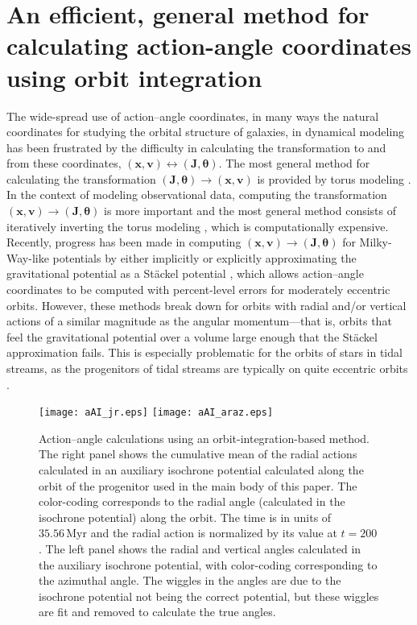 \documentclass{emulateapj}
\newcommand{\eg}{e.g.}
\renewcommand{\vec}[1]{\ensuremath{\mathbf{#1}}}
\newcommand{\vecx}{\ensuremath{\vec{x}}}
\newcommand{\vecv}{\ensuremath{\vec{v}}}
\newcommand{\vecj}{\ensuremath{\vec{J}}}
\newcommand{\veca}{\ensuremath{\boldsymbol\theta}}
\newcommand{\Myr}{\ensuremath{\,\mathrm{Myr}}}
\begin{document}
\appendix

\section{An efficient, general method for calculating action-angle coordinates using orbit integration}\label{sec:aa}

The wide-spread use of action--angle coordinates, in many ways the
natural coordinates for studying the orbital structure of galaxies, in
dynamical modeling has been frustrated by the difficulty in
calculating the transformation to and from these coordinates,
$(\vecx,\vecv) \leftrightarrow (\vecj,\veca)$. The most general method
for calculating the transformation $(\vecj,\veca) \rightarrow
(\vecx,\vecv)$ is provided by torus modeling \citep{McGill90a}. In the
context of modeling observational data, computing the transformation
$(\vecx,\vecv) \rightarrow (\vecj,\veca)$ is more important and the
most general method consists of iteratively inverting the torus
modeling \citep{McMillan08a}, which is computationally
expensive. Recently, progress has been made in computing
$(\vecx,\vecv) \rightarrow (\vecj,\veca)$ for Milky-Way-like
potentials by either implicitly or explicitly approximating the
gravitational potential as a St\"{a}ckel potential
\citep{Binney12a,Sanders12a}, which allows action--angle coordinates
to be computed with percent-level errors for moderately eccentric
orbits. However, these methods break down for orbits with radial
and/or vertical actions of a similar magnitude as the angular
momentum---that is, orbits that feel the gravitational potential over
a volume large enough that the St\"{a}ckel approximation fails. This
is especially problematic for the orbits of stars in tidal streams, as
the progenitors of tidal streams are typically on quite eccentric
orbits \citep[\eg,][]{Sanders13a}.

\begin{figure}[t!]
 \texttt{[image: aAI\_jr.eps]}
 \texttt{[image: aAI\_araz.eps]}
  \caption{Action--angle calculations using an orbit-integration-based
    method. The right panel shows the cumulative mean of the radial
    actions calculated in an auxiliary isochrone potential calculated
    along the orbit of the progenitor used in the main body of this
    paper. The color-coding corresponds to the radial angle
    (calculated in the isochrone potential) along the orbit. The time
    is in units of $35.56\Myr$ and the radial action is normalized by
    its value at $t=200$. The left panel shows the radial and vertical
    angles calculated in the auxiliary isochrone potential, with
    color-coding corresponding to the azimuthal angle. The wiggles in
    the angles are due to the isochrone potential not being the
    correct potential, but these wiggles are fit and removed to
    calculate the true angles.}\label{fig:aAI}
\end{figure}
\end{document}
